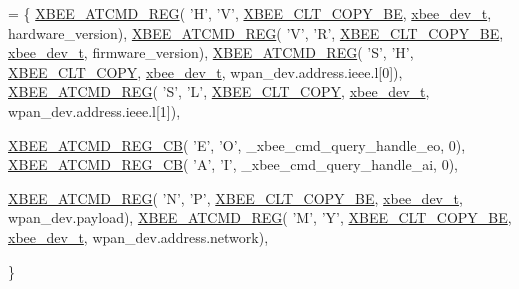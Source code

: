\begin{DoxyCode}
= \{
   \hyperlink{group__xbee__atcmd_gaafe33c3d8ea48b42b25d1183eaf93071}{XBEE\_ATCMD\_REG}( \textcolor{charliteral}{'H'}, \textcolor{charliteral}{'V'}, \hyperlink{group__xbee__atcmd_gga1bd8ecd38c107579d20ded3c79a7d70ba0be0c682bc30049849b0c169b661c537}{XBEE\_CLT\_COPY\_BE}, 
      \hyperlink{structxbee__dev__t}{xbee\_dev\_t}, hardware\_version),
   \hyperlink{group__xbee__atcmd_gaafe33c3d8ea48b42b25d1183eaf93071}{XBEE\_ATCMD\_REG}( \textcolor{charliteral}{'V'}, \textcolor{charliteral}{'R'}, \hyperlink{group__xbee__atcmd_gga1bd8ecd38c107579d20ded3c79a7d70ba0be0c682bc30049849b0c169b661c537}{XBEE\_CLT\_COPY\_BE}, 
      \hyperlink{structxbee__dev__t}{xbee\_dev\_t}, firmware\_version),
   \hyperlink{group__xbee__atcmd_gaafe33c3d8ea48b42b25d1183eaf93071}{XBEE\_ATCMD\_REG}( \textcolor{charliteral}{'S'}, \textcolor{charliteral}{'H'}, \hyperlink{group__xbee__atcmd_gga1bd8ecd38c107579d20ded3c79a7d70baef8d715c8725d801676943b868508633}{XBEE\_CLT\_COPY}, 
      \hyperlink{structxbee__dev__t}{xbee\_dev\_t}, wpan\_dev.address.ieee.l[0]),
   \hyperlink{group__xbee__atcmd_gaafe33c3d8ea48b42b25d1183eaf93071}{XBEE\_ATCMD\_REG}( \textcolor{charliteral}{'S'}, \textcolor{charliteral}{'L'}, \hyperlink{group__xbee__atcmd_gga1bd8ecd38c107579d20ded3c79a7d70baef8d715c8725d801676943b868508633}{XBEE\_CLT\_COPY}, 
      \hyperlink{structxbee__dev__t}{xbee\_dev\_t}, wpan\_dev.address.ieee.l[1]),





   \hyperlink{group__xbee__atcmd_gabbaf60bd4d186b860fd58c8a6111e9f9}{XBEE\_ATCMD\_REG\_CB}( \textcolor{charliteral}{'E'}, \textcolor{charliteral}{'O'}, \_xbee\_cmd\_query\_handle\_eo, 0),
   \hyperlink{group__xbee__atcmd_gabbaf60bd4d186b860fd58c8a6111e9f9}{XBEE\_ATCMD\_REG\_CB}( \textcolor{charliteral}{'A'}, \textcolor{charliteral}{'I'}, \_xbee\_cmd\_query\_handle\_ai, 0),
   
   \hyperlink{group__xbee__atcmd_gaafe33c3d8ea48b42b25d1183eaf93071}{XBEE\_ATCMD\_REG}( \textcolor{charliteral}{'N'}, \textcolor{charliteral}{'P'}, \hyperlink{group__xbee__atcmd_gga1bd8ecd38c107579d20ded3c79a7d70ba0be0c682bc30049849b0c169b661c537}{XBEE\_CLT\_COPY\_BE}, 
      \hyperlink{structxbee__dev__t}{xbee\_dev\_t}, wpan\_dev.payload),
   \hyperlink{group__xbee__atcmd_gaafe33c3d8ea48b42b25d1183eaf93071}{XBEE\_ATCMD\_REG}( \textcolor{charliteral}{'M'}, \textcolor{charliteral}{'Y'}, \hyperlink{group__xbee__atcmd_gga1bd8ecd38c107579d20ded3c79a7d70ba0be0c682bc30049849b0c169b661c537}{XBEE\_CLT\_COPY\_BE}, 
      \hyperlink{structxbee__dev__t}{xbee\_dev\_t}, wpan\_dev.address.network),

\}
\end{DoxyCode}
